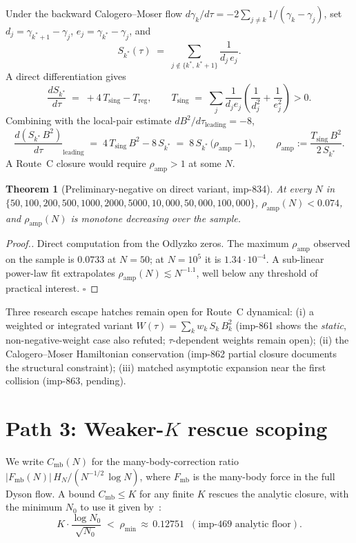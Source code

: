 \documentclass[11pt]{article}
\newtheorem{theorem}{Theorem}
\theoremstyle{definition}
\begin{document}
Under the backward Calogero--Moser flow $d\gamma_k/d\tau = -2 \sum_{j
\neq k} 1/(\gamma_k - \gamma_j)$, set $d_j = \gamma_{k^{*}+1} -
\gamma_j$, $e_j = \gamma_{k^{*}} - \gamma_j$, and
\[
S_{k^{*}}(\tau) \;=\; \sum_{j \notin \{k^{*},\,k^{*}+1\}} \frac{1}{d_j\,e_j}.
\]
A direct differentiation gives
\[
\frac{dS_{k^{*}}}{d\tau} \;=\; + 4\,T_{\text{sing}} - T_{\text{reg}},
\qquad
T_{\text{sing}} \;=\; \sum_{j} \frac{1}{d_j e_j}\!\left( \frac{1}{d_j^2} + \frac{1}{e_j^2} \right) > 0.
\]
Combining with the local-pair estimate $dB^2/d\tau_{\text{leading}} = -8$,
\[
\frac{d(S_{k^{*}}\,B^2)}{d\tau}_{\text{leading}}
\;=\; 4\,T_{\text{sing}}\,B^2 - 8\,S_{k^{*}}
\;=\; 8\,S_{k^{*}}\,\bigl( \rho_{\text{amp}} - 1 \bigr),
\qquad
\rho_{\text{amp}} := \frac{T_{\text{sing}}\,B^2}{2\,S_{k^{*}}}.
\]
A Route~C closure would require $\rho_{\text{amp}} > 1$ at some $N$.

\begin{theorem}[Preliminary-negative on direct variant, imp-834]
\label{thm:path2}
At every $N$ in $\{50, 100, 200, 500, 1000, 2000, 5000, 10{,}000, 50{,}000,
100{,}000\}$, $\rho_{\text{amp}}(N) < 0.074$, and $\rho_{\text{amp}}(N)$
is monotone decreasing over the sample.
\end{theorem}

\begin{proof}[Proof.]
Direct computation from the Odlyzko zeros. The maximum
$\rho_{\text{amp}}$ observed on the sample is $0.0733$ at $N = 50$; at
$N = 10^5$ it is $1.34 \cdot 10^{-4}$. A sub-linear power-law fit
extrapolates $\rho_{\text{amp}}(N) \lesssim N^{-1.1}$, well below any
threshold of practical interest. $\square$
\end{proof}

Three research escape hatches remain open for Route~C dynamical:
(i) a weighted or integrated variant $W(\tau) = \sum_k w_k\,S_k\,B_k^2$
(imp-861 shows the \emph{static}, non-negative-weight case also
refuted; $\tau$-dependent weights remain open);
(ii) the Calogero--Moser Hamiltonian conservation
(imp-862 partial closure documents the structural constraint);
(iii) matched asymptotic expansion near the first collision (imp-863, pending).

\section{Path 3: Weaker-$K$ rescue scoping}

We write $C_{\text{mb}}(N)$ for the many-body-correction ratio
$|F_{\text{mb}}(N)|\,H_N / (N^{-1/2}\,\log N)$, where $F_{\text{mb}}$ is
the many-body force in the full Dyson flow. A bound $C_{\text{mb}} \leq
K$ for any finite $K$ rescues the analytic closure, with the minimum
$N_0$ to use it given by~\cite{imp-486}:
\[
K \cdot \frac{\log N_0}{\sqrt{N_0}} \;<\; \rho_{\min} \,\approx\, 0.12751
\;\;(\text{imp-469 analytic floor}).
\]
\end{document}
